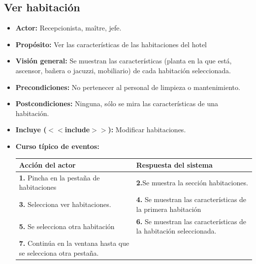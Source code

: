 \documentclass[spanish,a4paper,11pt, twoside]{report}	%
\begin{document}
	
	\hspace{-1.7 true cm}
	\subsection{Ver habitación}
		\begin{itemize}
			\item \textbf{Actor:} Recepcionista, maître, jefe.
			\item \textbf{Propósito: } Ver las características de las habitaciones del hotel
			\item \textbf{Visión general:} Se muestran las características (planta en la que está, ascensor, bañera o jacuzzi, mobiliario) de cada habitación seleccionada.
			\item \textbf{Precondiciones:} No pertenecer al personal de limpieza o mantenimiento.
			\item \textbf{Postcondiciones:} Ninguna, sólo se mira las características de una habitación.
			\item \textbf{Incluye ($<<$include$>>$):} Modificar habitaciones.
			\item \textbf{Curso típico de eventos:} 	\\
				\begin{tabular}{|p{6cm}||p{6cm}|}
				\hline
				\textbf{Acción del actor} & \textbf{Respuesta del sistema} \\ \hline
				\textbf{1.} Pincha en la pestaña de habitaciones & \textbf{2.}Se muestra la sección habitaciones.\\ \hline 
				\textbf{3.} Selecciona ver habitaciones. & \textbf{4.} Se muestran las características de la primera habitación  \\ \hline
				\textbf{5.} Se selecciona otra habitación & \textbf{6.} Se muestran las características de la habitación seleccionada. \\ \hline
				\textbf{7.} Continúa en la ventana hasta que se selecciona otra pestaña. & \\ \hline
			\end{tabular}
			\\
		\end {itemize}
		
\end{document}
